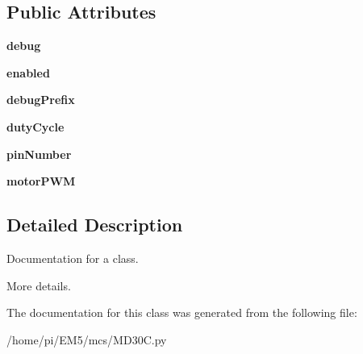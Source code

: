 \subsection*{Public Attributes}
\begin{DoxyCompactItemize}
\item 
\mbox{\label{classmcs_1_1MD30C_1_1MD30C_aec3bb0a4044668372d4307e0a3998a39}} 
{\bfseries debug}
\item 
\mbox{\label{classmcs_1_1MD30C_1_1MD30C_ad0daf03d5dfcb3b92c444ec72d1568a2}} 
{\bfseries enabled}
\item 
\mbox{\label{classmcs_1_1MD30C_1_1MD30C_a5591b8c49501ff8be7c8756c2ba090ee}} 
{\bfseries debug\+Prefix}
\item 
\mbox{\label{classmcs_1_1MD30C_1_1MD30C_aa3df8abec2ac062d5d68fe9a0066586a}} 
{\bfseries duty\+Cycle}
\item 
\mbox{\label{classmcs_1_1MD30C_1_1MD30C_a87e73478757f101ba84e688b83a84d2f}} 
{\bfseries pin\+Number}
\item 
\mbox{\label{classmcs_1_1MD30C_1_1MD30C_a393e633471a05730969fd8431bffff56}} 
{\bfseries motor\+P\+WM}
\end{DoxyCompactItemize}


\subsection{Detailed Description}
Documentation for a class. 

More details. 

The documentation for this class was generated from the following file\+:\begin{DoxyCompactItemize}
\item 
/home/pi/\+E\+M5/mcs/M\+D30\+C.\+py\end{DoxyCompactItemize}
